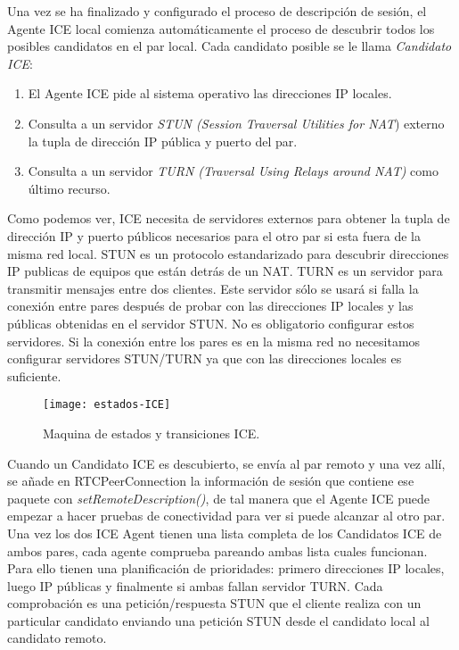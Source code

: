 Una vez se ha finalizado y configurado el proceso de descripción de sesión, el Agente ICE local comienza automáticamente el proceso de descubrir todos los posibles candidatos en el par local. Cada candidato posible se le llama \textit{Candidato ICE}:

\begin{enumerate}
\item El Agente ICE pide al sistema operativo las direcciones IP locales.
\item Consulta a un servidor \emph{STUN (Session Traversal Utilities for NAT}) externo la tupla de dirección IP pública y puerto del par.
\item Consulta a un servidor \emph{TURN (Traversal Using Relays around NAT)} como último recurso. 
\end{enumerate}

Como podemos ver, ICE necesita de servidores externos para obtener la tupla de dirección IP y puerto públicos necesarios para el otro par si esta fuera de la misma red local. STUN  es un protocolo estandarizado para descubrir direcciones IP publicas de equipos que están detrás de un NAT. TURN es un servidor para transmitir mensajes entre dos clientes. Este servidor sólo se usará si falla la conexión entre pares después de probar con las direcciones IP locales y las públicas obtenidas en el servidor STUN. No es obligatorio configurar estos servidores. Si la conexión entre los pares es en la misma red no necesitamos configurar servidores STUN/TURN ya que con las direcciones locales es suficiente.\\

\begin{figure}[htb]
\centering
\texttt{[image: estados-ICE]}
\caption{Maquina de estados y transiciones ICE.}
\label{fig:estados-ice}
\end{figure}

 
Cuando un Candidato ICE es descubierto, se envía al par remoto y una vez allí, se añade en RTCPeerConnection la información de sesión que contiene ese paquete con \textit{setRemoteDescription()}, de tal manera que el Agente ICE puede empezar a hacer pruebas de conectividad para ver si puede alcanzar al otro par.\\

Una vez los dos ICE Agent tienen una lista completa de los Candidatos ICE de ambos pares, cada agente comprueba pareando ambas lista cuales funcionan. Para ello tienen una planificación de prioridades: primero direcciones IP locales, luego IP públicas y finalmente si ambas fallan servidor TURN. Cada comprobación es una petición/respuesta STUN que el cliente realiza con un particular candidato enviando una petición STUN desde el candidato local al candidato remoto.\\

